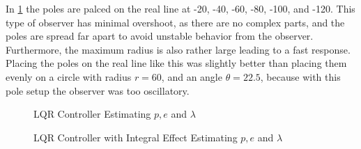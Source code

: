 In \cref{fig:LQR_Estimator} the poles are palced on the real line at
-20, -40, -60, -80, -100, and -120. This type of observer has minimal
overshoot, as there are no complex parts, and the poles are spread far
apart to avoid unstable behavior from the observer. Furthermore, the
maximum radius is also rather large leading to a fast
response. Placing the poles on the real line like this was slightly
better than placing them evenly on a circle with radius $r = 60$, and
an angle $\theta = 22.5$, because with this pole setup the observer
was too oscillatory.
\begin{figure}
  \caption{LQR Controller Estimating $p, e$ and $\lambda$}
  \label{fig:LQR_Estimator}
\end{figure}

\begin{figure}[p]
  \caption{LQR Controller with Integral Effect Estimating $p, e$ and $\lambda$}
  \label{fig:LQRIntegralEffect_Estimator}
\end{figure}
\restoregeometry

